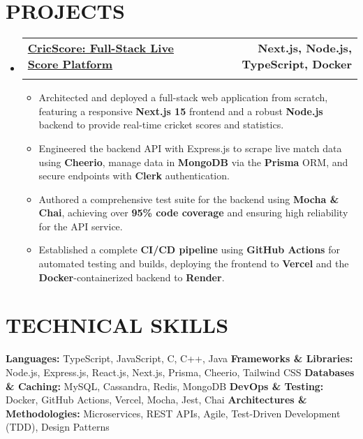 \documentclass[letterpaper,11pt]{article}
\makeatletter
\newcommand{\resumeSubheading}[4]{
  \vspace{-2pt}\item
    \begin{tabular*}{1.0\textwidth}[t]{l@{\extracolsep{\fill}}r}
      \textbf{\large#1} & \textbf{\small #2} \\
      \textit{\large#3} & \textit{\small #4} \\
    \end{tabular*}\vspace{-7pt}
}
\newcommand{\resumeItem}[1]{
  \item\small{
    {#1 \vspace{-2pt}}
  }
}
\newcommand{\resumeSubHeadingListStart}{\begin{itemize}[leftmargin=0.0in, label={}]}
\newcommand{\resumeSubHeadingListEnd}{\end{itemize}}
\newcommand{\resumeItemListStart}{\begin{itemize}}
\newcommand{\resumeItemListEnd}{\end{itemize}\vspace{-5pt}}
\makeatother
\begin{document}
\section{PROJECTS}
  \resumeSubHeadingListStart
    \resumeSubheading
      {\href{https://cricscore.deveshsangwan.com/}{CricScore: Full-Stack Live Score Platform \raisebox{-0.1\height}{\faLink}}}{Next.js, Node.js, TypeScript, Docker}{}{}
      \vspace{-10pt}
    \resumeItemListStart
        \resumeItem{Architected and deployed a full-stack web application from scratch, featuring a responsive \textbf{Next.js 15} frontend and a robust \textbf{Node.js} backend to provide real-time cricket scores and statistics.}
        \resumeItem{Engineered the backend API with Express.js to scrape live match data using \textbf{Cheerio}, manage data in \textbf{MongoDB} via the \textbf{Prisma} ORM, and secure endpoints with \textbf{Clerk} authentication.}
        \resumeItem{Authored a comprehensive test suite for the backend using \textbf{Mocha \& Chai}, achieving over \textbf{95\% code coverage} and ensuring high reliability for the API service.}
        \resumeItem{Established a complete \textbf{CI/CD pipeline} using \textbf{GitHub Actions} for automated testing and builds, deploying the frontend to \textbf{Vercel} and the \textbf{Docker}-containerized backend to \textbf{Render}.}
    \resumeItemListEnd
  \resumeSubHeadingListEnd

\section{TECHNICAL SKILLS}
    \small{
    \textbf{Languages:} TypeScript, JavaScript, C, C++, Java \newline
    \textbf{Frameworks \& Libraries:} Node.js, Express.js, React.js, Next.js, Prisma, Cheerio, Tailwind CSS \newline
    \textbf{Databases \& Caching:} MySQL, Cassandra, Redis, MongoDB \newline
    \textbf{DevOps \& Testing:} Docker, GitHub Actions, Vercel, Mocha, Jest, Chai \newline
    \textbf{Architectures \& Methodologies:} Microservices, REST APIs, Agile, Test-Driven Development (TDD), Design Patterns
    }

\end{document}
